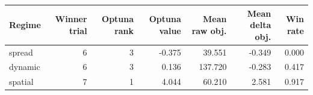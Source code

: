 \begin{tabular}{lrrrrrr}
\toprule
Regime & Winner trial & Optuna rank & Optuna value & Mean raw obj. & Mean delta obj. & Win rate \\
\midrule
spread & 6 & 3 & -0.375 & 39.551 & -0.349 & 0.000 \\
dynamic & 6 & 3 & 0.136 & 137.720 & -0.283 & 0.417 \\
spatial & 7 & 1 & 4.044 & 60.210 & 2.581 & 0.917 \\
\bottomrule
\end{tabular}